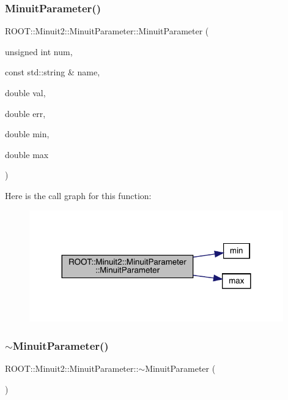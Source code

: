 \subsubsection{\texorpdfstring{MinuitParameter()}{MinuitParameter()}\hspace{0.1cm}{\footnotesize\ttfamily [11/12]}}
{\footnotesize\ttfamily R\+O\+O\+T\+::\+Minuit2\+::\+Minuit\+Parameter\+::\+Minuit\+Parameter (\begin{DoxyParamCaption}\item[{unsigned int}]{num,  }\item[{const std\+::string \&}]{name,  }\item[{double}]{val,  }\item[{double}]{err,  }\item[{double}]{min,  }\item[{double}]{max }\end{DoxyParamCaption})\hspace{0.3cm}{\ttfamily [inline]}}

Here is the call graph for this function\+:
\nopagebreak
\begin{figure}[H]
\begin{center}
\leavevmode
\includegraphics[width=311pt]{dd/dfb/classROOT_1_1Minuit2_1_1MinuitParameter_a13b433906347405bf85ef2bdf5803990_cgraph}
\end{center}
\end{figure}
\mbox{\label{classROOT_1_1Minuit2_1_1MinuitParameter_a487d895f06a46c8c2e1e3dbc97dd0a26}} 
\subsubsection{\texorpdfstring{$\sim$MinuitParameter()}{~MinuitParameter()}\hspace{0.1cm}{\footnotesize\ttfamily [3/3]}}
{\footnotesize\ttfamily R\+O\+O\+T\+::\+Minuit2\+::\+Minuit\+Parameter\+::$\sim$\+Minuit\+Parameter (\begin{DoxyParamCaption}{ }\end{DoxyParamCaption})\hspace{0.3cm}{\ttfamily [inline]}}

